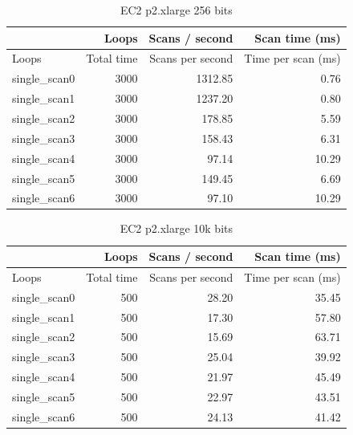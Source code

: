 \begin{table}[!htb]
\centering
\begin{tabular}{| l | r | r | r |}
    \hline
    & Loops & Scans / second & Scan time (ms) \\ \hline
    Loops & Total time & Scans per second & Time per scan (ms) \\
    single\_scan0 & 3000 & 1312.85 & 0.76 \\
    single\_scan1 & 3000 & 1237.20 & 0.80 \\
    single\_scan2 & 3000 & 178.85 & 5.59 \\
    single\_scan3 & 3000 & 158.43 & 6.31 \\
    single\_scan4 & 3000 & 97.14 & 10.29 \\
    single\_scan5 & 3000 & 149.45 & 6.69 \\
    single\_scan6 & 3000 & 97.10 & 10.29 \\
\end{tabular}
\caption{EC2 p2.xlarge 256 bits
\label{tab:perf-imac-256}}
\end{table}

\begin{table}[!htb]
\centering
\begin{tabular}{| l | r | r | r |}
    \hline
    & Loops & Scans / second & Scan time (ms) \\ \hline
    Loops & Total time & Scans per second & Time per scan (ms) \\
    single\_scan0 & 500 & 28.20 & 35.45 \\
    single\_scan1 & 500 & 17.30 & 57.80 \\
    single\_scan2 & 500 & 15.69 & 63.71 \\
    single\_scan3 & 500 & 25.04 & 39.92 \\
    single\_scan4 & 500 & 21.97 & 45.49 \\
    single\_scan5 & 500 & 22.97 & 43.51 \\
    single\_scan6 & 500 & 24.13 & 41.42 \\
\end{tabular}
\caption{EC2 p2.xlarge 10k bits
\label{tab:perf-imac-256}}
\end{table}

